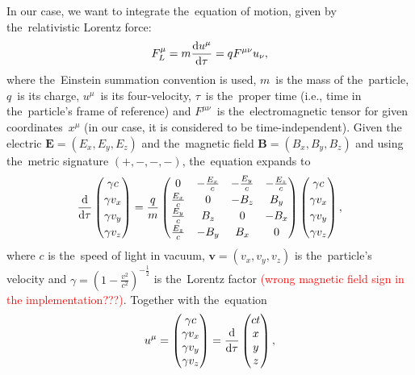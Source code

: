 		In our case, we want to integrate the~equation of motion, given by the~relativistic Lorentz force:
			\begin{equation}
				F^\mu_L = m\derivative{u^\mu}{\tau} = q F^{\mu\nu}u_{\nu},
			\end{equation}
		where the~Einstein summation convention is used, $m$~is the mass of the~particle, $q$~is its charge, $u^\mu$~is its four-velocity, $\tau$~is the~proper time (i.e., time in the~particle's frame of reference) and $F^{\mu\nu}$~is the~electromagnetic tensor for given coordinates~$x^\mu$ (in our case, it is considered to be time-independent). Given the electric $\mathbf{E} = (E_x,E_y,E_z)$ and the~magnetic field $\mathbf{B} = (B_x,B_y,B_z)$ and using the~metric signature $(+,-,-,-)$, the~equation expands to
			\begin{equation}
				\renewcommand{\arraystretch}{1.2}
				\derivative{}{\tau} \begin{pmatrix}\gamma c\\ \gamma v_x\\ \gamma v_y\\ \gamma v_z\end{pmatrix} = \frac{q}{m} 
				\begin{pmatrix}
					0             & -\frac{E_x}{c} & -\frac{E_y}{c} & -\frac{E_z}{c} \\
					\frac{E_x}{c} &  0             & -B_z           &  B_y           \\
					\frac{E_y}{c} &  B_z           &  0             & -B_x           \\
					\frac{E_z}{c} & -B_y           &  B_x           &  0
				\end{pmatrix}
				\begin{pmatrix}\gamma c\\ \gamma v_x\\ \gamma v_y\\ \gamma v_z\end{pmatrix},
				\renewcommand{\arraystretch}{1}
			\end{equation}
		where $c$ is the~speed of light in vacuum, $\mathbf{v} = (v_x,v_y,v_z)$ is the~particle's velocity and $\gamma = \left(1-\frac{v^2}{c^2}\right)^{-\frac{1}{2}}$ is the~Lorentz factor \textcolor{red}{(wrong magnetic field sign in the implementation???)}. Together with the~equation
			\begin{equation}
				u^\mu = \begin{pmatrix}\gamma c\\ \gamma v_x\\ \gamma v_y\\ \gamma v_z\end{pmatrix} = \derivative{}{\tau} \begin{pmatrix} ct\\ x\\ y\\ z\end{pmatrix},
			\end{equation}
